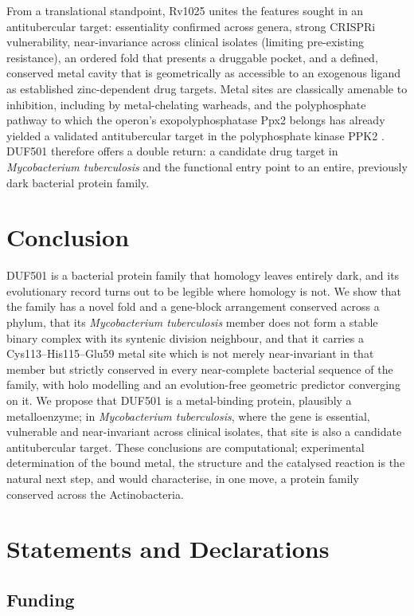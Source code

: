 \documentclass[11pt,a4paper]{article}
\newcommand{\mtb}{\textit{Mycobacterium tuberculosis}}
\begin{document}
From a translational standpoint, Rv1025 unites the features sought in an antitubercular target: essentiality confirmed across genera, strong CRISPRi vulnerability, near-invariance across clinical isolates (limiting pre-existing resistance), an ordered fold that presents a druggable pocket, and a defined, conserved metal cavity that is geometrically as accessible to an exogenous ligand as established zinc-dependent drug targets. Metal sites are classically amenable to inhibition, including by metal-chelating warheads, and the polyphosphate pathway to which the operon's exopolyphosphatase Ppx2 belongs has already yielded a validated antitubercular target in the polyphosphate kinase PPK2 \citep{singh2016ppk2target}. DUF501 therefore offers a double return: a candidate drug target in \mtb{} and the functional entry point to an entire, previously dark bacterial protein family.

\section{Conclusion}

DUF501 is a bacterial protein family that homology leaves entirely dark, and its evolutionary record turns out to be legible where homology is not. We show that the family has a novel fold and a gene-block arrangement conserved across a phylum, that its \mtb{} member does not form a stable binary complex with its syntenic division neighbour, and that it carries a Cys113--His115--Glu59 metal site which is not merely near-invariant in that member but strictly conserved in every near-complete bacterial sequence of the family, with holo modelling and an evolution-free geometric predictor converging on it. We propose that DUF501 is a metal-binding protein, plausibly a metalloenzyme; in \mtb{}, where the gene is essential, vulnerable and near-invariant across clinical isolates, that site is also a candidate antitubercular target. These conclusions are computational; experimental determination of the bound metal, the structure and the catalysed reaction is the natural next step, and would characterise, in one move, a protein family conserved across the Actinobacteria.

\section*{Statements and Declarations}

\subsection*{Funding}
\end{document}
